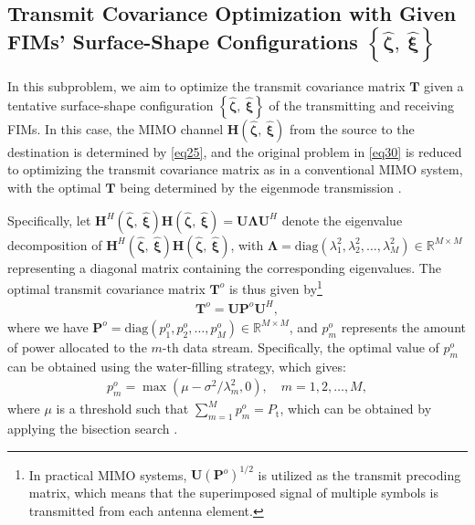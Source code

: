 \documentclass[lettersize,journal]{IEEEtran}
\begin{document}
\subsection{Transmit Covariance Optimization with Given FIMs' Surface-Shape Configurations $\left \{ \hat{\boldsymbol{\zeta}},\ \hat{\boldsymbol{\xi}}\right \}$}\label{sec3_1}
In this subproblem, we aim to optimize the transmit covariance matrix $\mathbf{T}$ given a tentative surface-shape configuration $\left \{ \hat{\boldsymbol{\zeta}},\ \hat{\boldsymbol{\xi}}\right \}$ of the transmitting and receiving FIMs. In this case, the MIMO channel $\mathbf{H}\left ( \hat{\boldsymbol{\zeta}},\ \hat{\boldsymbol{\xi}} \right )$ from the source to the destination is determined by \eqref{eq25}, and the original problem in \eqref{eq30} is reduced to optimizing the transmit covariance matrix as in a conventional MIMO system, with the optimal $\mathbf{T}$ being determined by the eigenmode transmission \cite{BOOK_2005_Tse_Fundamentals}.



Specifically, let $\mathbf{H}^{H}\left ( \hat{\boldsymbol{\zeta}},\ \hat{\boldsymbol{\xi}} \right )\mathbf{H}\left ( \hat{\boldsymbol{\zeta}},\ \hat{\boldsymbol{\xi}} \right )=\mathbf{U}\mathbf{\Lambda} \mathbf{U}^{H}$ denote the eigenvalue decomposition of $\mathbf{H}^{H}\left ( \hat{\boldsymbol{\zeta}},\ \hat{\boldsymbol{\xi}} \right )\mathbf{H}\left ( \hat{\boldsymbol{\zeta}},\ \hat{\boldsymbol{\xi}} \right )$, with $\boldsymbol{\Lambda }=\textrm{diag}\left ( \lambda _{1}^2,\lambda _{2}^2,\ldots ,\lambda _{M}^2 \right )\in \mathbb{R}^{M \times M}$ representing a diagonal matrix containing the corresponding eigenvalues. The optimal transmit covariance matrix $\mathbf{T}^{o}$ is thus given by\footnote{In practical MIMO systems, $\mathbf{U}\left ( \mathbf{P}^{o}\right )^{1/2}$ is utilized as the transmit precoding matrix, which means that the superimposed signal of multiple symbols is transmitted from each antenna element.}
\begin{align}\label{eq31}
 \mathbf{T}^{o}=\mathbf{U}\mathbf{P}^{o}\mathbf{U}^{H},
\end{align}
where we have $\mathbf{P}^{o}=\textrm{diag}\left ( p_{1}^{o},p_{2}^{o},\ldots ,p_{M}^{o} \right )\in \mathbb{R}^{M\times M}$, and $p_m^{o}$ represents the amount of power allocated to the $m$-th data stream. Specifically, the optimal value of $p_m^{o}$ can be obtained using the water-filling strategy, which gives:
\begin{align}\label{eq32}
 p_{m}^{o}=\max\left ( \mu - \sigma ^{2}/\lambda _{m}^{2},0 \right ),\quad m = 1,2,\ldots ,M,
\end{align}
where $\mu$ is a threshold such that $\sum\nolimits_{m=1}^{M}p_{m}^{o}=P_{\textrm{t}}$, which can be obtained by applying the bisection search \cite{TCOM_2022_An_Low}.
\end{document}
